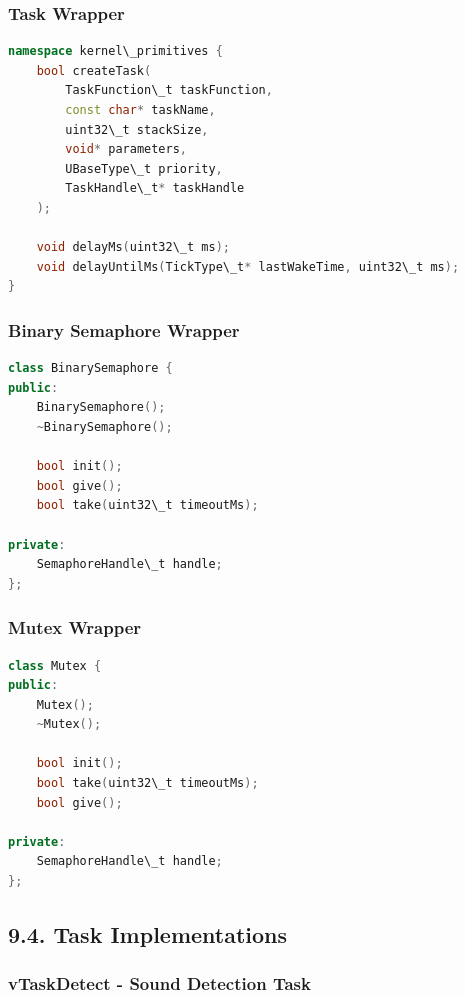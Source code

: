 \documentclass[12pt]{article}
\begin{document}
\subsubsection*{Task Wrapper}

\begin{lstlisting}[language=C++, caption=Task Creation Wrapper (task.h/cpp)]
namespace kernel\_primitives {
    bool createTask(
        TaskFunction\_t taskFunction,
        const char* taskName,
        uint32\_t stackSize,
        void* parameters,
        UBaseType\_t priority,
        TaskHandle\_t* taskHandle
    );
    
    void delayMs(uint32\_t ms);
    void delayUntilMs(TickType\_t* lastWakeTime, uint32\_t ms);
}
\end{lstlisting}

\subsubsection*{Binary Semaphore Wrapper}

\begin{lstlisting}[language=C++, caption=Binary Semaphore Wrapper (binary\_semaphore.h/cpp)]
class BinarySemaphore {
public:
    BinarySemaphore();
    ~BinarySemaphore();
    
    bool init();
    bool give();
    bool take(uint32\_t timeoutMs);
    
private:
    SemaphoreHandle\_t handle;
};
\end{lstlisting}

\subsubsection*{Mutex Wrapper}

\begin{lstlisting}[language=C++, caption=Mutex Wrapper (mutex.h/cpp)]
class Mutex {
public:
    Mutex();
    ~Mutex();
    
    bool init();
    bool take(uint32\_t timeoutMs);
    bool give();
    
private:
    SemaphoreHandle\_t handle;
};
\end{lstlisting}

\subsection*{9.4. Task Implementations}

\subsubsection*{vTaskDetect - Sound Detection Task}
\end{document}
